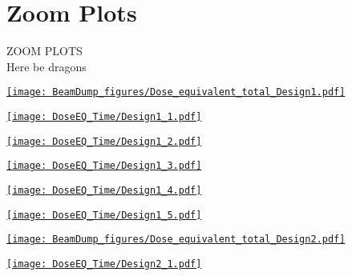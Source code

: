 \documentclass[xcolor={dvipsnames}]{beamer}
\begin{document}
\section{Zoom Plots}
\begin{frame}
  \begin{center}
    \huge
    ZOOM PLOTS\\
    \tiny
    Here be dragons
  \end{center}
\end{frame}
\begin{frame}[plain]
 \hypertarget{Dose_equivalent_Design1}{\hyperlink{coolingtimesprev_Design1}{\texttt{[image: BeamDump\_figures/Dose\_equivalent\_total\_Design1.pdf]}}}
\end{frame}
\begin{frame}[plain]
 \hypertarget{Dose_equivalent_minute_Design1}{\hyperlink{coolingtimesprev_Design1}{\texttt{[image: DoseEQ\_Time/Design1\_1.pdf]}}}
\end{frame}
\begin{frame}[plain]
 \hypertarget{Dose_equivalent_hour_Design1}{\hyperlink{coolingtimesprev_Design1}{\texttt{[image: DoseEQ\_Time/Design1\_2.pdf]}}}
\end{frame}
\begin{frame}[plain]
 \hypertarget{Dose_equivalent_day_Design1}{\hyperlink{coolingtimesprev_Design1}{\texttt{[image: DoseEQ\_Time/Design1\_3.pdf]}}}
\end{frame}
\begin{frame}[plain]
 \hypertarget{Dose_equivalent_month_Design1}{\hyperlink{coolingtimesprev_Design1}{\texttt{[image: DoseEQ\_Time/Design1\_4.pdf]}}}
\end{frame}
\begin{frame}[plain]
 \hypertarget{Dose_equivalent_year_Design1}{\hyperlink{coolingtimesprev_Design1}{\texttt{[image: DoseEQ\_Time/Design1\_5.pdf]}}}
\end{frame}
\begin{frame}[plain]
 \hypertarget{Dose_equivalent_Design2}{\hyperlink{coolingtimesprev_Design2}{\texttt{[image: BeamDump\_figures/Dose\_equivalent\_total\_Design2.pdf]}}}
\end{frame}
\begin{frame}[plain]
 \hypertarget{Dose_equivalent_minute_Design2}{\hyperlink{coolingtimesprev_Design2}{\texttt{[image: DoseEQ\_Time/Design2\_1.pdf]}}}
\end{frame}
\end{document}
